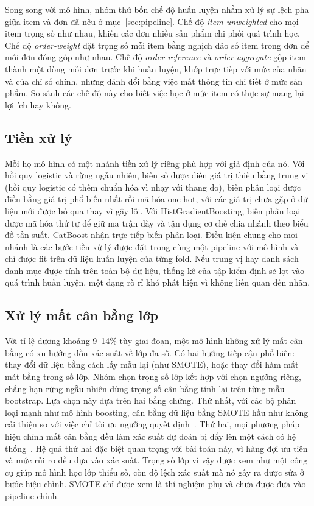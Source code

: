 \documentclass[12pt,a4paper]{report}
\begin{document}
Song song với mô hình, nhóm thử bốn chế độ huấn luyện nhằm xử lý sự lệch pha giữa item và đơn đã nêu ở mục~\ref{sec:pipeline}. Chế độ \emph{item-unweighted} cho mọi item trọng số như nhau, khiến các đơn nhiều sản phẩm chi phối quá trình học. Chế độ \emph{order-weight} đặt trọng số mỗi item bằng nghịch đảo số item trong đơn để mỗi đơn đóng góp như nhau. Chế độ \emph{order-reference} và \emph{order-aggregate} gộp item thành một dòng mỗi đơn trước khi huấn luyện, khớp trực tiếp với mức của nhãn và của chỉ số chính, nhưng đánh đổi bằng việc mất thông tin chi tiết ở mức sản phẩm. So sánh các chế độ này cho biết việc học ở mức item có thực sự mang lại lợi ích hay không.

\subsection{Tiền xử lý}

Mỗi họ mô hình có một nhánh tiền xử lý riêng phù hợp với giả định của nó. Với hồi quy logistic và rừng ngẫu nhiên, biến số được điền giá trị thiếu bằng trung vị (hồi quy logistic có thêm chuẩn hóa vì nhạy với thang đo), biến phân loại được điền bằng giá trị phổ biến nhất rồi mã hóa one-hot, với các giá trị chưa gặp ở dữ liệu mới được bỏ qua thay vì gây lỗi. Với HistGradientBoosting, biến phân loại được mã hóa thứ tự để giữ ma trận dày và tận dụng cơ chế chia nhánh theo biểu đồ tần suất. CatBoost nhận trực tiếp biến phân loại. Điều kiện chung cho mọi nhánh là các bước tiền xử lý được đặt trong cùng một pipeline với mô hình và chỉ được fit trên dữ liệu huấn luyện của từng fold. Nếu trung vị hay danh sách danh mục được tính trên toàn bộ dữ liệu, thống kê của tập kiểm định sẽ lọt vào quá trình huấn luyện, một dạng rò rỉ khó phát hiện vì không liên quan đến nhãn.

\subsection{Xử lý mất cân bằng lớp}

Với tỉ lệ dương khoảng 9--14\% tùy giai đoạn, một mô hình không xử lý mất cân bằng có xu hướng dồn xác suất về lớp đa số. Có hai hướng tiếp cận phổ biến: thay đổi dữ liệu bằng cách lấy mẫu lại (như SMOTE), hoặc thay đổi hàm mất mát bằng trọng số lớp. Nhóm chọn trọng số lớp kết hợp với chọn ngưỡng riêng, chẳng hạn rừng ngẫu nhiên dùng trọng số cân bằng tính lại trên từng mẫu bootstrap. Lựa chọn này dựa trên hai bằng chứng. Thứ nhất, với các bộ phân loại mạnh như mô hình boosting, cân bằng dữ liệu bằng SMOTE hầu như không cải thiện so với việc chỉ tối ưu ngưỡng quyết định~\cite{elor2022smote}. Thứ hai, mọi phương pháp hiệu chỉnh mất cân bằng đều làm xác suất dự đoán bị đẩy lên một cách có hệ thống~\cite{vandengoorbergh2022}. Hệ quả thứ hai đặc biệt quan trọng với bài toán này, vì hàng đợi ưu tiên và mức rủi ro đều dựa vào xác suất. Trọng số lớp vì vậy được xem như một công cụ giúp mô hình học lớp thiểu số, còn độ lệch xác suất mà nó gây ra được sửa ở bước hiệu chỉnh. SMOTE chỉ được xem là thí nghiệm phụ và chưa được đưa vào pipeline chính.
\end{document}
